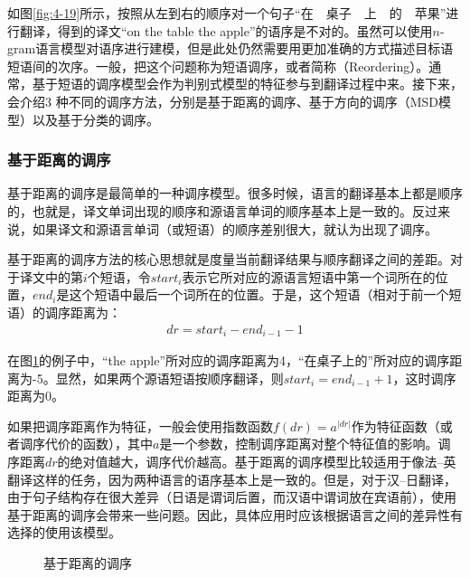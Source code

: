 \parinterval 如图\ref{fig:4-19}所示，按照从左到右的顺序对一个句子``在\ \ 桌子\ \ 上\ \ 的\ \ 苹果''进行翻译，得到的译文``on the table the apple''的语序是不对的。虽然可以使用$n$-gram语言模型对语序进行建模，但是此处仍然需要用更加准确的方式描述目标语短语间的次序。一般，把这个问题称为短语调序，或者简称{\small{}}（Reordering）。通常，基于短语的调序模型会作为判别式模型的特征参与到翻译过程中来。接下来，会介绍3 种不同的调序方法，分别是基于距离的调序、基于方向的调序（MSD模型）以及基于分类的调序。


\subsubsection{基于距离的调序}

\parinterval 基于距离的调序是最简单的一种调序模型。很多时候，语言的翻译基本上都是顺序的，也就是，译文单词出现的顺序和源语言单词的顺序基本上是一致的。反过来说，如果译文和源语言单词（或短语）的顺序差别很大，就认为出现了调序。

\parinterval 基于距离的调序方法的核心思想就是度量当前翻译结果与顺序翻译之间的差距。对于译文中的第$i$个短语，令$start_i$表示它所对应的源语言短语中第一个词所在的位置，$end_i$是这个短语中最后一个词所在的位置。于是，这个短语（相对于前一个短语）的调序距离为：
\begin{eqnarray}
dr = start_i-end_{i-1}-1
\label{eq:4-15}
\end{eqnarray}

\parinterval 在图\ref{fig:4-20}的例子中，``the apple''所对应的调序距离为4，``在桌子上的''所对应的调序距离为-5。显然，如果两个源语短语按顺序翻译，则$start_i = end_{i-1} + 1$，这时调序距离为0。

\parinterval 如果把调序距离作为特征，一般会使用指数函数$f(dr) = a^{|dr|}$作为特征函数（或者调序代价的函数），其中$a$是一个参数，控制调序距离对整个特征值的影响。调序距离$dr$的绝对值越大，调序代价越高。基于距离的调序模型比较适用于像法–英翻译这样的任务，因为两种语言的语序基本上是一致的。但是，对于汉–日翻译，由于句子结构存在很大差异（日语是谓词后置，而汉语中谓词放在宾语前），使用基于距离的调序会带来一些问题。因此，具体应用时应该根据语言之间的差异性有选择的使用该模型。

\begin{figure}[htp]
\centering

\caption{基于距离的调序}
\label{fig:4-20}
\end{figure}

